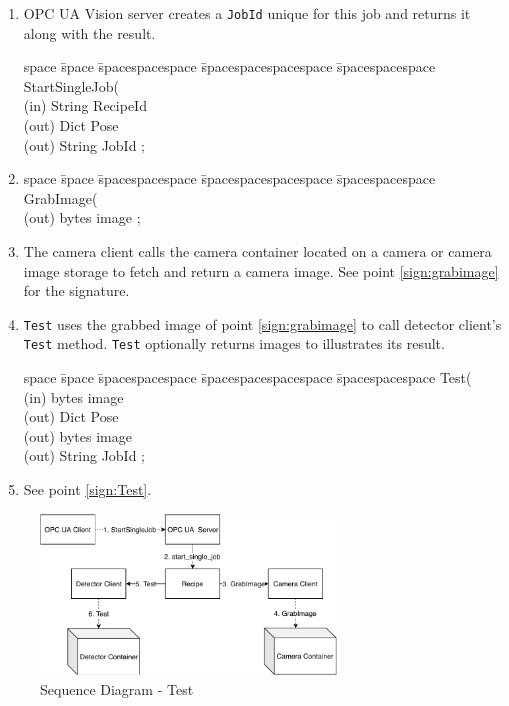 \begin{enumerate}
    \item OPC UA Vision server creates a \texttt{JobId} unique for this job and returns it along with the result.
    \begin{tabbing}
    space \= space \= spacespacespace \= spacespacespacespace \= spacespacespace \kill
    \>  StartSingleJob(\\
    \>  \>  (in)	 \> 	String          \> RecipeId\\
    \>  \>  (out)	 \> 	Dict          \> Pose \\
    \>  \>  (out)	 \> 	String          \> JobId ; 
    \end{tabbing}
    \item 
    \begin{tabbing}
    space \= space \= spacespacespace \= spacespacespacespace \= spacespacespace \kill
    \>  GrabImage(\\
    \>  \>  (out)	 \> 	bytes          \> image ; 
    \end{tabbing} \label{sign:grabimage}
    \item The camera client calls the camera container located on a camera or camera image storage to fetch and return a camera image. See point \ref{sign:grabimage} for the signature.
    \item \texttt{Test} uses the grabbed image of point \ref{sign:grabimage} to call detector client's \texttt{Test} method. \texttt{Test} optionally returns images to illustrates its result. 
    \begin{tabbing}
    space \= space \= spacespacespace \= spacespacespacespace \= spacespacespace \kill
    \>  Test(\\
    \>  \>  (in)	 \> 	bytes          \> image\\
    \>  \>  (out)	 \> 	Dict          \> Pose \\
    \>  \>  (out)	 \> 	bytes          \> image \\
    \>  \>  (out)	 \> 	String          \> JobId ; 
    \end{tabbing}\label{sign:Test}
    \item See point \ref{sign:Test}.
\end{enumerate}

\begin{figure}[ht]
	\centering
  \includegraphics[width=0.7\textwidth]{img/SequenceDiagram-Test.pdf}
	\caption{Sequence Diagram - Test}
	\label{fig:SequenceDiagram-Test}
\end{figure}

